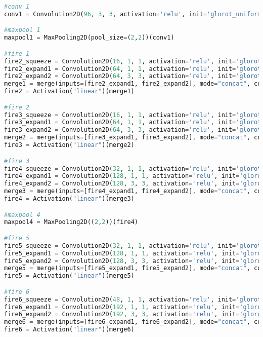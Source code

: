 \begin{lstlisting}[language=Python,label={code:squeezenet},caption={SqueezeNet Code}]
#conv 1
conv1 = Convolution2D(96, 3, 3, activation='relu', init='glorot_uniform',subsample=(2,2),border_mode='valid')(input_layer)

#maxpool 1
maxpool1 = MaxPooling2D(pool_size=(2,2))(conv1)

#fire 1
fire2_squeeze = Convolution2D(16, 1, 1, activation='relu', init='glorot_uniform',border_mode='same')(maxpool1)
fire2_expand1 = Convolution2D(64, 1, 1, activation='relu', init='glorot_uniform',border_mode='same')(fire2_squeeze)
fire2_expand2 = Convolution2D(64, 3, 3, activation='relu', init='glorot_uniform',border_mode='same')(fire2_squeeze)
merge1 = merge(inputs=[fire2_expand1, fire2_expand2], mode="concat", concat_axis=1)
fire2 = Activation("linear")(merge1)

#fire 2
fire3_squeeze = Convolution2D(16, 1, 1, activation='relu', init='glorot_uniform',border_mode='same')(fire2)
fire3_expand1 = Convolution2D(64, 1, 1, activation='relu', init='glorot_uniform',border_mode='same')(fire3_squeeze)
fire3_expand2 = Convolution2D(64, 3, 3, activation='relu', init='glorot_uniform',border_mode='same')(fire3_squeeze)
merge2 = merge(inputs=[fire3_expand1, fire3_expand2], mode="concat", concat_axis=1)
fire3 = Activation("linear")(merge2)

#fire 3
fire4_squeeze = Convolution2D(32, 1, 1, activation='relu', init='glorot_uniform',border_mode='same')(fire3)
fire4_expand1 = Convolution2D(128, 1, 1, activation='relu', init='glorot_uniform',border_mode='same')(fire4_squeeze)
fire4_expand2 = Convolution2D(128, 3, 3, activation='relu', init='glorot_uniform',border_mode='same')(fire4_squeeze)
merge3 = merge(inputs=[fire4_expand1, fire4_expand2], mode="concat", concat_axis=1)
fire4 = Activation("linear")(merge3)

#maxpool 4
maxpool4 = MaxPooling2D((2,2))(fire4)

#fire 5
fire5_squeeze = Convolution2D(32, 1, 1, activation='relu', init='glorot_uniform',border_mode='same')(maxpool4)
fire5_expand1 = Convolution2D(128, 1, 1, activation='relu', init='glorot_uniform',border_mode='same')(fire5_squeeze)
fire5_expand2 = Convolution2D(128, 3, 3, activation='relu', init='glorot_uniform',border_mode='same')(fire5_squeeze)
merge5 = merge(inputs=[fire5_expand1, fire5_expand2], mode="concat", concat_axis=1)
fire5 = Activation("linear")(merge5)

#fire 6
fire6_squeeze = Convolution2D(48, 1, 1, activation='relu', init='glorot_uniform',border_mode='same')(fire5)
fire6_expand1 = Convolution2D(192, 1, 1, activation='relu', init='glorot_uniform',border_mode='same')(fire6_squeeze)
fire6_expand2 = Convolution2D(192, 3, 3, activation='relu', init='glorot_uniform',border_mode='same')(fire6_squeeze)
merge6 = merge(inputs=[fire6_expand1, fire6_expand2], mode="concat", concat_axis=1)
fire6 = Activation("linear")(merge6)


\end{lstlisting}
